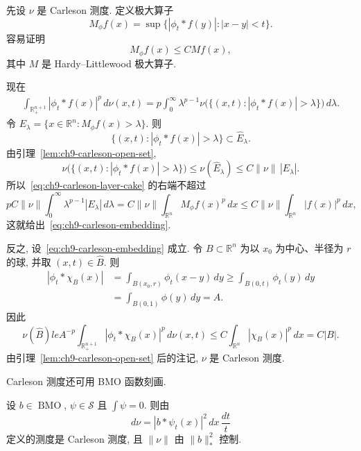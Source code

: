 \hypertarget{chapter-09-page-211}{}
\begin{Proof}
先设 $\nu$ 是 Carleson 测度. 定义极大算子
\[
 M_\phi f(x)=\sup\{|\phi_t*f(y)|:|x-y|<t\}.
\]
容易证明
\[
 M_\phi f(x)\le CMf(x),
\]
其中 $M$ 是 Hardy--Littlewood 极大算子.

现在
\begin{equation}
 \begin{aligned}
 \int_{\mathbb R_+^{n+1}}|\phi_t*f(x)|^p\,d\nu(x,t)
 =p\int_0^\infty\lambda^{p-1}
 \nu\bigl(\{(x,t):|\phi_t*f(x)|>\lambda\}\bigr)\,d\lambda.
 \end{aligned}
 \label{eq:ch9-carleson-layer-cake}
\end{equation}
令 $E_\lambda=\{x\in\mathbb R^n:M_\phi f(x)>\lambda\}$. 则
\[
 \{(x,t):|\phi_t*f(x)|>\lambda\}\subset\widehat E_\lambda.
\]
由引理~\ref{lem:ch9-carleson-open-set},
\[
 \nu\bigl(\{(x,t):|\phi_t*f(x)|>\lambda\}\bigr)
 \le\nu(\widehat E_\lambda)\le C\|\nu\|\,|E_\lambda|.
\]
所以~\eqref{eq:ch9-carleson-layer-cake} 的右端不超过
\[
 pC\|\nu\|\int_0^\infty\lambda^{p-1}|E_\lambda|\,d\lambda
 =C\|\nu\|\int_{\mathbb R^n}M_\phi f(x)^p\,dx
 \le C\|\nu\|\int_{\mathbb R^n}|f(x)|^p\,dx,
\]
这就给出~\eqref{eq:ch9-carleson-embedding}.

反之, 设~\eqref{eq:ch9-carleson-embedding} 成立. 令 $B\subset\mathbb R^n$ 为以 $x_0$ 为中心、半径为 $r$ 的球, 并取 $(x,t)\in\widehat B$. 则
\[
 \begin{aligned}
 |\phi_t*\chi_B(x)|
 &=\int_{B(x_0,r)}\phi_t(x-y)\,dy
 \ge\int_{B(0,t)}\phi_t(y)\,dy\\
 &=\int_{B(0,1)}\phi(y)\,dy=A.
 \end{aligned}
\]
因此
\[
 \nu(\widehat B)le A^{-p}\int_{\mathbb R_+^{n+1}}
 |\phi_t*\chi_B(x)|^p\,d\nu(x,t)
 \le C\int_{\mathbb R^n}|\chi_B(x)|^p\,dx=C|B|.
\]
由引理~\ref{lem:ch9-carleson-open-set} 后的注记, $\nu$ 是 Carleson 测度.
\end{Proof}

Carleson 测度还可用 BMO 函数刻画.

\begin{Theorem}
\label{thm:ch9-bmo-carleson-measure}
设 $b\in\operatorname{BMO}$, $\psi\in\mathcal S$ 且 $\int\psi=0$. 则由
\[
 d\nu=|b*\psi_t(x)|^2\,dx\,\frac{dt}{t}
\]
定义的测度是 Carleson 测度, 且 $\|\nu\|$ 由 $\|b\|_*^2$ 控制.
\end{Theorem}

